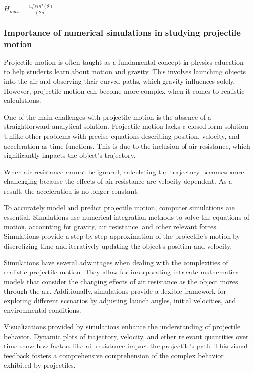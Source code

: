 \documentclass[11pt]{article}
\begin{document}
\(H_{max} = \frac{v₀² sin²(θ)}{(2g)}\)

    \hypertarget{importance-of-numerical-simulations-in-studying-projectile-motion}{%
\subsubsection{Importance of numerical simulations in studying
projectile
motion}\label{importance-of-numerical-simulations-in-studying-projectile-motion}}

Projectile motion is often taught as a fundamental concept in physics
education to help students learn about motion and gravity. This involves
launching objects into the air and observing their curved paths, which
gravity influences solely. However, projectile motion can become more
complex when it comes to realistic calculations.

One of the main challenges with projectile motion is the absence of a
straightforward analytical solution. Projectile motion lacks a
closed-form solution Unlike other problems with precise equations
describing position, velocity, and acceleration as time functions. This
is due to the inclusion of air resistance, which significantly impacts
the object's trajectory.

When air resistance cannot be ignored, calculating the trajectory
becomes more challenging because the effects of air resistance are
velocity-dependent. As a result, the acceleration is no longer constant.

To accurately model and predict projectile motion, computer simulations
are essential. Simulations use numerical integration methods to solve
the equations of motion, accounting for gravity, air resistance, and
other relevant forces. Simulations provide a step-by-step approximation
of the projectile's motion by discretizing time and iteratively updating
the object's position and velocity.

Simulations have several advantages when dealing with the complexities
of realistic projectile motion. They allow for incorporating intricate
mathematical models that consider the changing effects of air resistance
as the object moves through the air. Additionally, simulations provide a
flexible framework for exploring different scenarios by adjusting launch
angles, initial velocities, and environmental conditions.

Visualizations provided by simulations enhance the understanding of
projectile behavior. Dynamic plots of trajectory, velocity, and other
relevant quantities over time show how factors like air resistance
impact the projectile's path. This visual feedback fosters a
comprehensive comprehension of the complex behavior exhibited by
projectiles.
\end{document}

